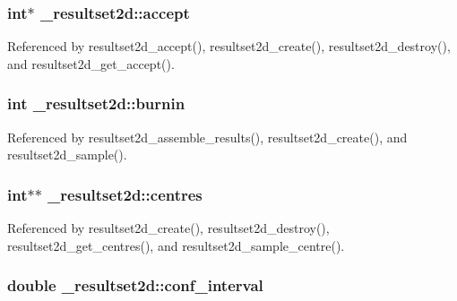 \subsubsection[{\texorpdfstring{accept}{accept}}]{\setlength{\rightskip}{0pt plus 5cm}int$\ast$ \+\_\+resultset2d\+::accept}\hypertarget{struct__resultset2d_afab488a69a8bcc69d0cc4cf7df762aaa}{}\label{struct__resultset2d_afab488a69a8bcc69d0cc4cf7df762aaa}


Referenced by resultset2d\+\_\+accept(), resultset2d\+\_\+create(), resultset2d\+\_\+destroy(), and resultset2d\+\_\+get\+\_\+accept().

\subsubsection[{\texorpdfstring{burnin}{burnin}}]{\setlength{\rightskip}{0pt plus 5cm}int \+\_\+resultset2d\+::burnin}\hypertarget{struct__resultset2d_afa8584c9a4bf42e5b9548501c384ed5a}{}\label{struct__resultset2d_afa8584c9a4bf42e5b9548501c384ed5a}


Referenced by resultset2d\+\_\+assemble\+\_\+results(), resultset2d\+\_\+create(), and resultset2d\+\_\+sample().

\subsubsection[{\texorpdfstring{centres}{centres}}]{\setlength{\rightskip}{0pt plus 5cm}int$\ast$$\ast$ \+\_\+resultset2d\+::centres}\hypertarget{struct__resultset2d_ad868e1040ec7cd4ebde3076af182bed9}{}\label{struct__resultset2d_ad868e1040ec7cd4ebde3076af182bed9}


Referenced by resultset2d\+\_\+create(), resultset2d\+\_\+destroy(), resultset2d\+\_\+get\+\_\+centres(), and resultset2d\+\_\+sample\+\_\+centre().

\subsubsection[{\texorpdfstring{conf\+\_\+interval}{conf_interval}}]{\setlength{\rightskip}{0pt plus 5cm}double \+\_\+resultset2d\+::conf\+\_\+interval}\hypertarget{struct__resultset2d_af9cfa75a5bd9c971b73c4a696743486b}{}\label{struct__resultset2d_af9cfa75a5bd9c971b73c4a696743486b}


